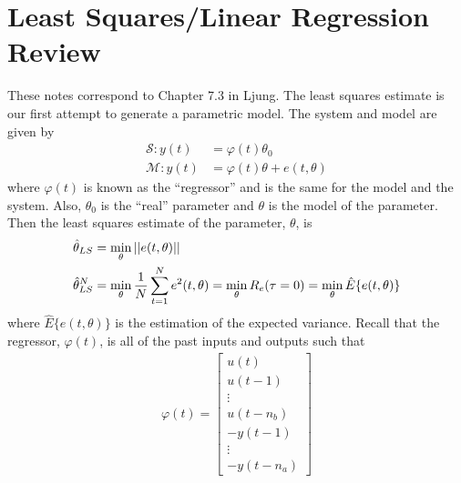 % 
% 
%
%
% 
\mainmatter
\setcounter{page}{1}

\lectureseries[\course]{\course}

\date{October 20, 2009}

\setaddress

\setcounter{lecture}{7}
\setcounter{chapter}{7}


\section{Least Squares/Linear Regression Review}
These notes correspond to Chapter 7.3 in Ljung. The least squares estimate is our first attempt to generate a parametric model. The system and model are given by
\begin{align*}
\mathcal{S}: y(t) &= \varphi(t)\theta_0 \\
\mathcal{M}: y(t) &= \varphi(t)\theta + e(t,\theta)
\end{align*}
where $\varphi(t)$ is known as the ``regressor'' and is the same for the model and the system. Also, $\theta_0$ is the ``real'' parameter and $\theta$ is the model of the parameter. Then the least squares estimate of the parameter, $\theta$, is
\begin{align*}
\hat{\theta}_{LS} &= \min_\theta ||e(t,\theta)|| \\
\hat{\theta}_{LS}^N &= \min_\theta \frac{1}{N}\sum_{t=1}^Ne^2(t,\theta) = \min_\theta R_e(\tau=0) = \min_\theta\hat{E}\{e(t,\theta)\}
\end{align*}
where $\hat{E}\{e(t,\theta)\}$ is the estimation of the expected variance. Recall that the regressor, $\varphi(t)$, is all of the past inputs and outputs such that
\begin{align}
\label{eq:regressor}
\varphi(t) = \left[\begin{array}{c} u(t) \\ u(t-1) \\ \vdots \\ u(t-n_b) \\ -y(t-1) \\ \vdots \\ -y(t-n_a) \end{array}\right]
\end{align}
